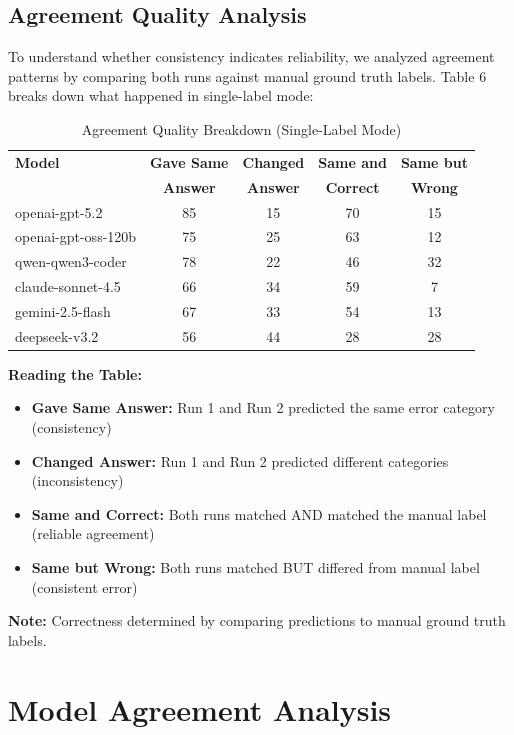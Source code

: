 \documentclass[12pt,a4paper]{article}
\begin{document}
\subsection{Agreement Quality Analysis}

To understand whether consistency indicates reliability, we analyzed agreement patterns by comparing both runs against manual ground truth labels. Table 6 breaks down what happened in single-label mode:

\begin{table}[H]
\centering
\begin{tabular}{lcccc}
\toprule
\textbf{Model} & \textbf{Gave Same} & \textbf{Changed} & \textbf{Same and} & \textbf{Same but} \\
 & \textbf{Answer} & \textbf{Answer} & \textbf{Correct} & \textbf{Wrong} \\
\midrule
openai-gpt-5.2 & 85 & 15 & 70 & 15 \\
openai-gpt-oss-120b & 75 & 25 & 63 & 12 \\
qwen-qwen3-coder & 78 & 22 & 46 & 32 \\
claude-sonnet-4.5 & 66 & 34 & 59 & 7 \\
gemini-2.5-flash & 67 & 33 & 54 & 13 \\
deepseek-v3.2 & 56 & 44 & 28 & 28 \\
\bottomrule
\end{tabular}
\caption{Agreement Quality Breakdown (Single-Label Mode)}
\end{table}

\textbf{Reading the Table:}
\begin{itemize}[leftmargin=*]
    \item \textbf{Gave Same Answer:} Run 1 and Run 2 predicted the same error category (consistency)
    \item \textbf{Changed Answer:} Run 1 and Run 2 predicted different categories (inconsistency)
    \item \textbf{Same and Correct:} Both runs matched AND matched the manual label (reliable agreement)
    \item \textbf{Same but Wrong:} Both runs matched BUT differed from manual label (consistent error)
\end{itemize}

\textbf{Note:} Correctness determined by comparing predictions to manual ground truth labels.

\newpage

\section{Model Agreement Analysis}
\end{document}
